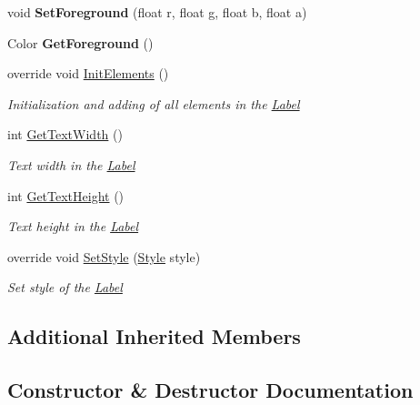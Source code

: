 \begin{DoxyCompactItemize}
\item 
\mbox{\label{class_space_v_i_l_1_1_label_a5dcf0b0f5fad75f4f7e978f37d044a0c}} 
void {\bfseries Set\+Foreground} (float r, float g, float b, float a)
\item 
\mbox{\label{class_space_v_i_l_1_1_label_a317a05e27808c542e4c48de32108078f}} 
Color {\bfseries Get\+Foreground} ()
\item 
override void \mbox{\hyperlink{class_space_v_i_l_1_1_label_a2bdc7da304e91a50a820b8c8f722c0be}{Init\+Elements}} ()
\begin{DoxyCompactList}\small\item\em Initialization and adding of all elements in the \mbox{\hyperlink{class_space_v_i_l_1_1_label}{Label}} \end{DoxyCompactList}\item 
int \mbox{\hyperlink{class_space_v_i_l_1_1_label_a679b77d3cf9beaa4b470782b40e91cca}{Get\+Text\+Width}} ()
\begin{DoxyCompactList}\small\item\em Text width in the \mbox{\hyperlink{class_space_v_i_l_1_1_label}{Label}} \end{DoxyCompactList}\item 
int \mbox{\hyperlink{class_space_v_i_l_1_1_label_a1428755f295e8cfd6b553b6d871615eb}{Get\+Text\+Height}} ()
\begin{DoxyCompactList}\small\item\em Text height in the \mbox{\hyperlink{class_space_v_i_l_1_1_label}{Label}} \end{DoxyCompactList}\item 
override void \mbox{\hyperlink{class_space_v_i_l_1_1_label_ae98bd34b1931300d5a6c908f80260ad8}{Set\+Style}} (\mbox{\hyperlink{class_space_v_i_l_1_1_decorations_1_1_style}{Style}} style)
\begin{DoxyCompactList}\small\item\em Set style of the \mbox{\hyperlink{class_space_v_i_l_1_1_label}{Label}} \end{DoxyCompactList}\end{DoxyCompactItemize}
\subsection*{Additional Inherited Members}


\subsection{Constructor \& Destructor Documentation}
\mbox{\label{class_space_v_i_l_1_1_label_aac85dea14968f4b4b68767e9a5138e92}} 
